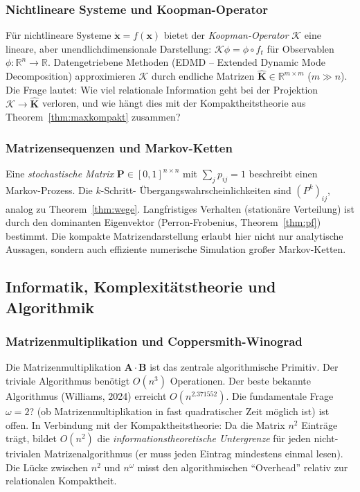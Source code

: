 ﻿\documentclass[12pt, a4paper]{article}
\theoremstyle{definition}
\theoremstyle{remark}
\newcommand{\R}{\mathbb{R}}
\newcommand{\vx}{\bm{x}}
\newcommand{\vA}{\bm{A}}
\newcommand{\vB}{\bm{B}}
\newcommand{\vP}{\bm{P}}
\newcommand{\vK}{\bm{K}}
\begin{document}
\subsubsection*{Nichtlineare Systeme und Koopman-Operator}

Für nichtlineare Systeme $\dot{\vx} = f(\vx)$ bietet der
\emph{Koopman-Operator} $\mathcal{K}$ eine lineare, aber
unendlichdimensionale Darstellung: $\mathcal{K} \phi = \phi \circ f_t$
für Observablen $\phi: \R^n \to \R$. Datengetriebene Methoden
(EDMD -- Extended Dynamic Mode Decomposition) approximieren $\mathcal{K}$
durch endliche Matrizen $\hat{\vK} \in \R^{m \times m}$ ($m \gg n$).
Die Frage lautet: Wie viel relationale Information geht bei der
Projektion $\mathcal{K} \to \hat{\vK}$ verloren, und wie hängt dies mit
der Kompaktheitstheorie aus Theorem~\ref{thm:maxkompakt} zusammen?

\subsubsection*{Matrizensequenzen und Markov-Ketten}

Eine \emph{stochastische Matrix} $\vP \in [0,1]^{n \times n}$ mit
$\sum_j p_{ij} = 1$ beschreibt einen Markov-Prozess. Die $k$-Schritt-
Übergangswahrscheinlichkeiten sind $(P^k)_{ij}$, analog zu
Theorem~\ref{thm:wege}. Langfristiges Verhalten (stationäre Verteilung)
ist durch den dominanten Eigenvektor (Perron-Frobenius,
Theorem~\ref{thm:pf}) bestimmt. Die kompakte Matrizendarstellung erlaubt
hier nicht nur analytische Aussagen, sondern auch effiziente numerische
Simulation großer Markov-Ketten.

\subsection{Informatik, Komplexitätstheorie und Algorithmik}
\label{subsec:algo_ausblick}

\subsubsection*{Matrizenmultiplikation und Coppersmith-Winograd}

Die Matrizenmultiplikation $\vA \cdot \vB$ ist das zentrale algorithmische
Primitiv. Der triviale Algorithmus benötigt $O(n^3)$ Operationen. Der
beste bekannte Algorithmus (Williams, 2024) erreicht $O(n^{2.371552})$.
Die fundamentale Frage $\omega = 2$? (ob Matrizenmultiplikation in fast
quadratischer Zeit möglich ist) ist offen. In Verbindung mit der
Kompaktheitstheorie: Da die Matrix $n^2$ Einträge trägt, bildet
$O(n^2)$ die \emph{informationstheoretische Untergrenze} für jeden
nicht-trivialen Matrizenalgorithmus (er muss jeden Eintrag mindestens
einmal lesen). Die Lücke zwischen $n^2$ und $n^\omega$ misst den
algorithmischen ``Overhead'' relativ zur relationalen Kompaktheit.
\end{document}
